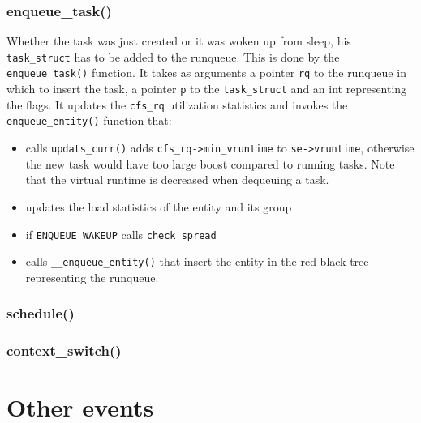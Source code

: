 \documentclass[10pt, oneside]{book}
\begin{document}
\subsubsection{enqueue\_task()}
Whether the task was just created or it was woken up from sleep, his \verb|task_struct| has to be added to the runqueue. This is done by the \verb|enqueue_task()| function. It takes as arguments a pointer \verb|rq| to the runqueue in which to insert the task, a pointer \verb|p| to the \verb|task_struct| and an int representing the flags. It updates the \verb|cfs_rq| utilization statistics and invokes the \verb|enqueue_entity()| function that:
\begin{itemize}
    \item calls \verb|updats_curr()| adds \verb|cfs_rq->min_vruntime| to \verb|se->vruntime|, otherwise the new task would have too large boost compared to running tasks. Note that the virtual runtime is decreased when dequeuing a task.
    \item updates the load statistics of the entity and its group
    \item if \verb|ENQUEUE_WAKEUP| calls \verb|check_spread|
    \item calls \verb|__enqueue_entity()| that insert the entity in the red-black tree representing the runqueue.
\end{itemize}

\subsubsection{schedule()}

\subsubsection{context\_switch()}

\section{Other events} %
\label{sec:other_events}
\end{document}
